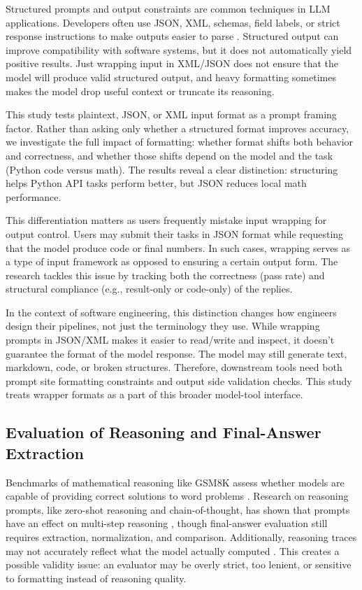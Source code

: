\documentclass{llncs}
\begin{document}
Structured prompts and output constraints are common techniques in LLM applications. Developers often use JSON, XML, schemas, field labels, or strict response instructions to make outputs easier to parse \citep{liu2024structuredoutput}. Structured output can improve compatibility with software systems, but it does not automatically yield positive results. Just wrapping input in XML/JSON does not ensure that the model will produce valid structured output, and heavy formatting sometimes makes the model drop useful context or truncate its reasoning.

This study tests plaintext, JSON, or XML input format as a prompt framing factor. Rather than asking only whether a structured format improves accuracy, we investigate the full impact of formatting: whether format shifts both behavior and correctness, and whether those shifts depend on the model and the task (Python code versus math). The results reveal a clear distinction: structuring helps Python API tasks perform better, but JSON reduces local math performance.

This differentiation matters as users frequently mistake input wrapping for output control. Users may submit their tasks in JSON format while requesting that the model produce code or final numbers. In such cases, wrapping serves as a type of input framework as opposed to ensuring a certain output form. The research tackles this issue by tracking both the correctness (pass rate) and structural compliance (e.g., result-only or code-only) of the replies.

In the context of software engineering, this distinction changes how engineers design their pipelines, not just the terminology they use. While wrapping prompts in JSON/XML makes it easier to read/write and inspect, it doesn't guarantee the format of the model response. The model may still generate text, markdown, code, or broken structures. Therefore, downstream tools need both prompt site formatting constraints and output side validation checks. This study treats wrapper formats as a part of this broader model-tool interface.

\subsection{Evaluation of Reasoning and Final-Answer
Extraction}\label{evaluation-of-reasoning-and-final-answer-extraction}

Benchmarks of mathematical reasoning like GSM8K assess whether models are capable of providing correct solutions to word problems \citep{cobbe2021gsm8k}. Research on reasoning prompts, like zero-shot reasoning and chain-of-thought, has shown that prompts have an effect on multi-step reasoning \citep{wei2022cot, kojima2022zeroshot}, though final-answer evaluation still requires extraction, normalization, and comparison. Additionally, reasoning traces may not accurately reflect what the model actually computed \citep{turpin2023unfaithful}. This creates a possible validity issue: an evaluator may be overly strict, too lenient, or sensitive to formatting instead of reasoning quality.
\end{document}
